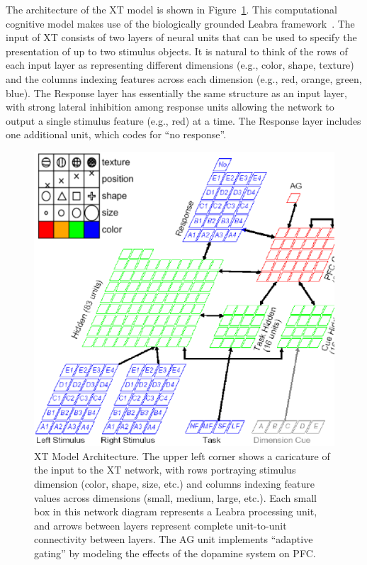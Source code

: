 \documentclass[man]{apa}
\begin{document}
The architecture of the XT model is shown in Figure~\ref{xt-layout-figure}.  This computational cognitive model makes use of the biologically grounded Leabra framework~\cite{OReillyRC:2000:Computational}.  The input of XT consists of two layers of neural units that can be used to specify the presentation of up to two stimulus objects.  It is natural to think of the rows of each input layer as representing different dimensions (e.g., color, shape, texture) and the columns indexing features across each dimension (e.g., red, orange, green, blue).  The Response layer has essentially the same structure as an input layer, with strong lateral inhibition among response units allowing the network to output a single stimulus feature (e.g., red) at a time.  The Response layer includes one additional unit, which codes for ``no response''.  

\begin{figure}
\begin{center}
	\includegraphics[width=125mm]{figures/xt_arch_2.ps}
\end{center}
\caption{XT Model Architecture.  The upper left corner shows a
         caricature of the input to the XT network, with rows
         portraying stimulus dimension (color, shape, size, etc.) and
         columns indexing feature values across dimensions (small,
         medium, large, etc.).  Each small box in this network diagram represents a Leabra processing unit, and arrows between layers represent complete unit-to-unit connectivity between layers.  The AG unit implements ``adaptive gating'' by modeling the effects of the dopamine system on PFC.}
\label{xt-layout-figure}
\end{figure} 
\end{document}
